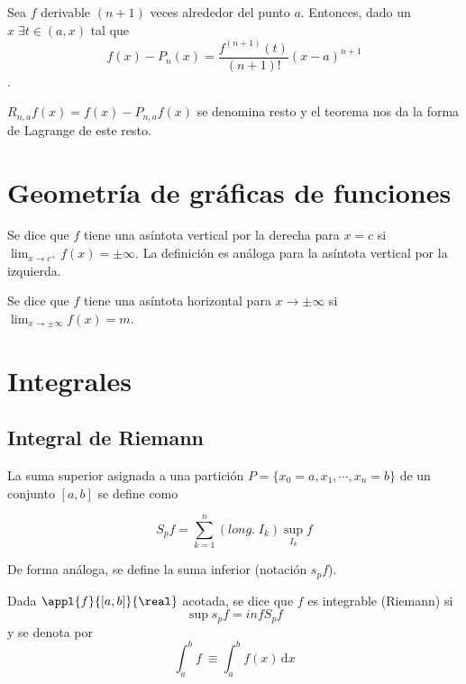\documentclass[palatino, nochap]{apuntes}
\begin{document}
\begin{theorem}
Sea $f$ derivable $(n+1)$ veces alrededor del punto $a$. Entonces, dado un $x\;\exists t \in (a,x)$ tal que
\[ f(x)-P_n(x)=\frac{f^{(n+1)}(t)}{(n+1)!}(x-a)^{n+1} \].

\end{theorem}

\begin{defn}[Resto] $R_{n,a}f(x)=f(x)-P_{n,a}f(x)$ se denomina resto y el teorema nos da la forma de Lagrange de este resto.\end{defn}

\section{Geometría de gráficas de funciones}

\begin{defn} Se dice que $f$ tiene una asíntota vertical por la derecha para $x=c$ si $\lim_{x\to c^+}f(x)=\pm \infty$. La definición es análoga para la asíntota vertical por la izquierda.\end{defn}

\begin{defn} Se dice que $f$ tiene una asíntota horizontal para $x\to \pm \infty$ si $\lim_{x\to \pm \infty}f(x)=m$.\end{defn}

\section{Integrales}

\subsection{Integral de Riemann}

\begin{defn}
La suma superior asignada a una partición $P=\{x_0=a, x_1,\cdots, x_n=b\}$ de un conjunto $[a, b]$ se define como

\[ S_pf =\sum_{k=1}^{n}(\textit{long.}\; I_k)\sup_{I_k} f \]

De forma análoga, se define la suma inferior (notación $s_pf$).\end{defn}

\begin{defn}
Dada $\appl{f}{[a,b]}{\real}$ acotada, se dice que $f$ es integrable (Riemann) si
\[ \sup s_pf = inf S_pf \] y se denota por
\[\int^b_a f\ \equiv \int^b_a f(x) \,\mathrm{d}x\]
\end{defn}
\end{document}
